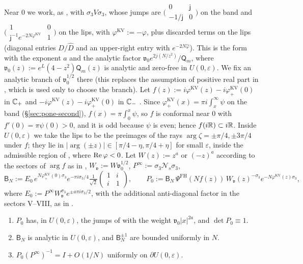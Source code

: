 Near $0$ we work, as \cite{KV}, with $\sigma_3V\sigma_3$, whose jumps are
$\bigl(\begin{smallmatrix}0&\mathsf j\\-1/\mathsf j&0\end{smallmatrix}\bigr)$ on the band and
$\bigl(\begin{smallmatrix}1&0\\\mathsf j^{-1}e^{-2N\varphi^{\mathrm{KV}}}&1\end{smallmatrix}\bigr)$ on the lips, with
$\varphi^{\mathrm{KV}}:=-\varphi$, plus discarded terms on the lips (diagonal entries $D/\hat D$ and an upper-right entry with
$e^{-2N\hat\varphi}$). This is the form \cite[(5.1)--(5.2)]{KV} with the exponent $a$ and the analytic factor
$\mathfrak v_0e^{2j(N/z^2)}/\mathsf Q_m$, where $\mathfrak v_0(z):=e^L(4-z^2)\mathsf Q_m(z)$ is analytic and zero-free in $U(0,\varepsilon)$. We fix an
analytic branch of $\mathfrak v_0^{1/2}$ there (this replaces the assumption of positive real part in \cite[\S4.1]{Van}, which is used
only to choose the branch). Let $f(z):=i\varphi^{\mathrm{KV}}(z)-i\varphi^{\mathrm{KV}}_+(0)$ in $\mathbb{C}_+$ and
$-i\varphi^{\mathrm{KV}}(z)-i\varphi^{\mathrm{KV}}_+(0)$ in $\mathbb{C}_-$ \cite[(5.6)]{KV}. Since $\varphi^{\mathrm{KV}}_+(x)=\pi i\int_x^\infty\psi$
on the band (\S\ref{sec:pone-second}), $f(x)=\pi\int_0^x\psi$, so $f$ is conformal near $0$ with $f'(0)=\pi\psi(0)>0$, and it is
odd because $\psi$ is even; hence $f(i\mathbb{R})\subset i\mathbb{R}$. Inside $U(0,\varepsilon)$ we take the lips to be the preimages of the
rays $\arg\zeta=\pm\pi/4,\pm3\pi/4$ under $f$; they lie in $|\arg(\pm z)|\in[\pi/4-\eta,\pi/4+\eta]$ for small $\varepsilon$,
inside the admissible region of \cite{WLXZ}, where $\operatorname{Re}\varphi<0$. Let $W(z):=z^a$ or $(-z)^a$ according to the sectors of
$\arg f$ as in \cite[(5.9)]{KV}, $W_{\mathfrak v}:=W\mathfrak v_0^{1/2}$, $P^\infty:=\sigma_3\mathcal N_s\sigma_3$,
\[
  \mathsf B_N:=E_0\,e^{N\varphi^{\mathrm{KV}}_+(0)\sigma_3}e^{-\pi i\sigma_3/4}\tfrac1{\sqrt2}\begin{pmatrix}1&i\\i&1\end{pmatrix},\qquad
  P_0:=\mathsf B_N\,\Psi^{\mathrm{FH}}(Nf(z))\,W_{\mathfrak v}(z)^{-\sigma_3}e^{-N\varphi^{\mathrm{KV}}(z)\sigma_3},
\]
where $E_0:=P^\infty W_{\mathfrak v}^{\sigma_3}e^{\pm a\pi i\sigma_3/2}$, with the additional anti-diagonal factor in the sectors V--VIII,
as in \cite[(5.26)--(5.30)]{KV}.

\begin{lemma}\label{lem:pone-fh}
\begin{enumerate}
\item[(i)] $P_0$ has, in $U(0,\varepsilon)$, the jumps of \cite[(5.1)--(5.2)]{KV} with the weight $\mathfrak v_0|x|^{2a}$, and
  $\det P_0\equiv1$.
\item[(ii)] $\mathsf B_N$ is analytic in $U(0,\varepsilon)$, and $\mathsf B_N^{\pm1}$ are bounded uniformly in $N$.
\item[(iii)] $P_0(P^\infty)^{-1}=I+O(1/N)$ uniformly on $\partial U(0,\varepsilon)$.
\end{enumerate}
\end{lemma}

